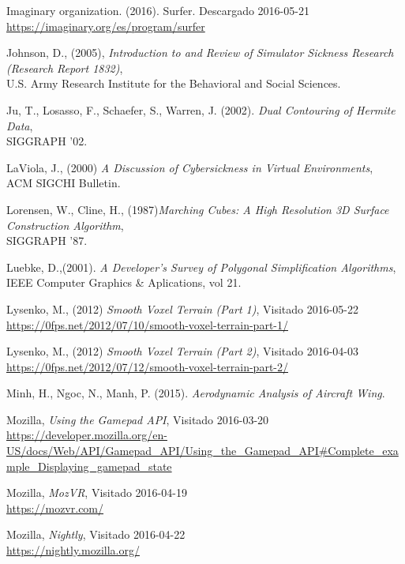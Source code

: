 \documentclass[12pt]{article}
\begin{document}
\begin{thebibliography}{9}
Imaginary organization. (2016). Surfer. 
Descargado 2016-05-21 
\\\url{https://imaginary.org/es/program/surfer}

Johnson, D., (2005), \textit{Introduction to and Review of Simulator Sickness Research (Research Report 1832)},\\
U.S. Army Research Institute for the Behavioral and Social Sciences.

Ju, T., Losasso, F., Schaefer, S., Warren, J. (2002). \textit{Dual Contouring of Hermite Data},\\
SIGGRAPH '02.

LaViola, J., (2000) \textit{A Discussion of Cybersickness in Virtual Environments},\\
ACM SIGCHI Bulletin.

Lorensen, W., Cline, H., (1987)\textit{Marching Cubes: A High Resolution 3D Surface Construction Algorithm},\\
SIGGRAPH  '87.

Luebke, D.,(2001). \textit{A Developer's Survey of Polygonal Simplification Algorithms},\\
IEEE Computer Graphics \& Aplications, vol 21.

Lysenko, M., (2012) \textit{Smooth Voxel Terrain (Part 1)},
Visitado 2016-05-22
\\\url{https://0fps.net/2012/07/10/smooth-voxel-terrain-part-1/}

Lysenko, M., (2012) \textit{Smooth Voxel Terrain (Part 2)},
Visitado 2016-04-03
\\\url{https://0fps.net/2012/07/12/smooth-voxel-terrain-part-2/}

Minh, H., Ngoc, N., Manh, P. (2015). \textit{Aerodynamic Analysis of Aircraft Wing}. 

Mozilla, \textit{Using the Gamepad API},
Visitado 2016-03-20
\\\url{https://developer.mozilla.org/en-US/docs/Web/API/Gamepad_API/Using_the_Gamepad_API#Complete_example_Displaying_gamepad_state}

Mozilla, \textit{MozVR},
Visitado 2016-04-19
\\\url{https://mozvr.com/}

Mozilla, \textit{Nightly},
Visitado 2016-04-22
\\\url{https://nightly.mozilla.org/}


\end{thebibliography}
\end{document}
